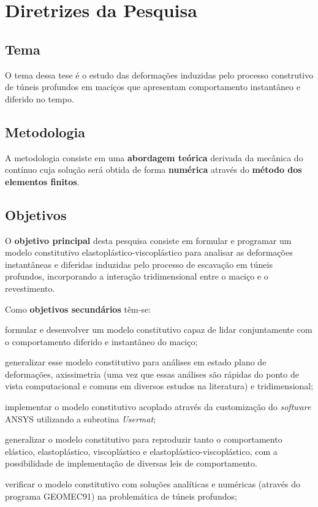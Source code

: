 \chapter{Diretrizes da Pesquisa}

\section{Tema}

O tema dessa tese é o estudo das deformações induzidas pelo processo construtivo de túneis profundos em maciços que apresentam comportamento instantâneo e diferido no tempo.

\section{Metodologia}

A metodologia consiste em uma \textbf{abordagem teórica} derivada da mecânica do contínuo cuja solução será obtida de forma \textbf{numérica} através do \textbf{método dos elementos finitos}.

\section{Objetivos}

O \textbf{objetivo principal} desta pesquisa consiste em formular e programar um modelo constitutivo elastoplástico-viscoplástico para analisar as deformações instantâneas e diferidas induzidas pelo processo de escavação em túneis profundos, incorporando a interação tridimensional entre o maciço e o revestimento.

Como \textbf{objetivos secundários} têm-se:

\begin{alineas}
	 

	\item formular e desenvolver um modelo constitutivo capaz de lidar conjuntamente com o comportamento diferido e instantâneo do maciço;
	
	\item generalizar esse modelo constitutivo para análises em estado plano de deformações, axissimetria (uma vez que essas análises são rápidas do ponto de vista computacional e comuns em diversos estudos na literatura) e tridimensional;
	
	\item implementar o modelo constitutivo acoplado através da customização do \textit{software} ANSYS utilizando a subrotina \textit{Usermat};
	
	\item generalizar o modelo constitutivo para reproduzir tanto o comportamento elástico, elastoplástico, viscoplástico e elastoplástico-viscoplástico, com a possibilidade de implementação de diversas leis de comportamento.
	
	\item verificar o modelo constitutivo com soluções analíticas e numéricas (através do programa GEOMEC91) na problemática de túneis profundos;
	
\end{alineas}

